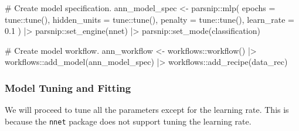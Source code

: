 \documentclass[
  letterpaper,
  DIV=11,
  numbers=noendperiod]{scrartcl}
\newenvironment{Shaded}{\begin{snugshade}}{\end{snugshade}}
\newcommand{\AttributeTok}[1]{\textcolor[rgb]{0.40,0.45,0.13}{#1}}
\newcommand{\CommentTok}[1]{\textcolor[rgb]{0.37,0.37,0.37}{#1}}
\newcommand{\FloatTok}[1]{\textcolor[rgb]{0.68,0.00,0.00}{#1}}
\newcommand{\FunctionTok}[1]{\textcolor[rgb]{0.28,0.35,0.67}{#1}}
\newcommand{\NormalTok}[1]{\textcolor[rgb]{0.00,0.23,0.31}{#1}}
\newcommand{\OtherTok}[1]{\textcolor[rgb]{0.00,0.23,0.31}{#1}}
\newcommand{\SpecialCharTok}[1]{\textcolor[rgb]{0.37,0.37,0.37}{#1}}
\newcommand{\StringTok}[1]{\textcolor[rgb]{0.13,0.47,0.30}{#1}}
\begin{document}
\begin{Shaded}
\begin{Highlighting}[]
\CommentTok{\# Create model specification.}
\NormalTok{ann\_model\_spec }\OtherTok{\textless{}{-}}
\NormalTok{  parsnip}\SpecialCharTok{::}\FunctionTok{mlp}\NormalTok{(}
    \AttributeTok{epochs =}\NormalTok{ tune}\SpecialCharTok{::}\FunctionTok{tune}\NormalTok{(),}
    \AttributeTok{hidden\_units =}\NormalTok{ tune}\SpecialCharTok{::}\FunctionTok{tune}\NormalTok{(),}
    \AttributeTok{penalty =}\NormalTok{ tune}\SpecialCharTok{::}\FunctionTok{tune}\NormalTok{(),}
    \AttributeTok{learn\_rate =} \FloatTok{0.1}
\NormalTok{  ) }\SpecialCharTok{|\textgreater{}}
\NormalTok{  parsnip}\SpecialCharTok{::}\FunctionTok{set\_engine}\NormalTok{(}\StringTok{\textquotesingle{}nnet\textquotesingle{}}\NormalTok{) }\SpecialCharTok{|\textgreater{}}
\NormalTok{  parsnip}\SpecialCharTok{::}\FunctionTok{set\_mode}\NormalTok{(}\StringTok{\textquotesingle{}classification\textquotesingle{}}\NormalTok{)}

\CommentTok{\# Create model workflow.}
\NormalTok{ann\_workflow }\OtherTok{\textless{}{-}}\NormalTok{ workflows}\SpecialCharTok{::}\FunctionTok{workflow}\NormalTok{() }\SpecialCharTok{|\textgreater{}}
\NormalTok{  workflows}\SpecialCharTok{::}\FunctionTok{add\_model}\NormalTok{(ann\_model\_spec) }\SpecialCharTok{|\textgreater{}}
\NormalTok{  workflows}\SpecialCharTok{::}\FunctionTok{add\_recipe}\NormalTok{(data\_rec)}
\end{Highlighting}
\end{Shaded}

\subsubsection{Model Tuning and
Fitting}\label{model-tuning-and-fitting-2}

We will proceed to tune all the parameters except for the learning rate.
This is because the \texttt{nnet} package does not support tuning the
learning rate.
\end{document}
